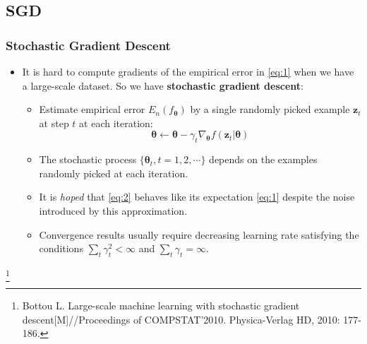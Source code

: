 \documentclass[10pt]{beamer}
\theoremstyle{mystyle}
\def\bb#1{\mathbf{#1}}
\newcommand{\bst}{\boldsymbol\theta}
\newcommand\blfootnote[1]{%
  \begingroup
  \renewcommand\thefootnote{}\footnote[frame]{#1}%
  \addtocounter{footnote}{-1}%
  \endgroup
}
\theoremstyle{mystyle}
\begin{document}
\subsection{SGD}
\begin{frame}
	\frametitle{Stochastic Gradient Descent}
	\begin{itemize}
		\item It is hard to compute gradients of the empirical error in \eqref{eq:1} when we have a large-scale dataset. So we have {\bf stochastic gradient descent}:
		\begin{itemize}
			\item Estimate empirical error $E_n(f_{\bst})$ by a single randomly picked example $\bb z_t$ at step $t$ at each iteration: 
			\begin{equation}\label{eq:2}
				\bst\leftarrow\bst-\gamma_t\nabla_{\bst}f(\bb{z}_t\vert\bst)
			\end{equation}
			\item The stochastic process $\{\bst_t, t=1,2,\cdots\}$ depends on the examples randomly picked at each iteration.
			\item It is {\it hoped} that \eqref{eq:2} behaves like its expectation \eqref{eq:1} despite the noise introduced by this approximation.
			\item Convergence results usually require decreasing learning rate satisfying the conditions $\sum_t\gamma_t^2<\infty$ and $\sum_t\gamma_t=\infty$.
		\end{itemize}
	
	\end{itemize}
	\blfootnote{Bottou L. Large-scale machine learning with stochastic gradient descent[M]//Proceedings of COMPSTAT'2010. Physica-Verlag HD, 2010: 177-186.}
\end{frame}
\end{document}
